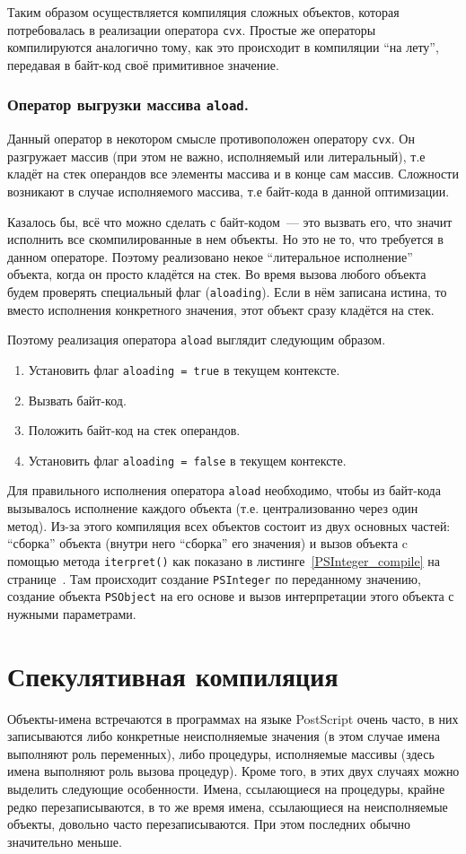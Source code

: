 	Таким образом осуществляется компиляция сложных объектов, которая потребовалась в реализации оператора \texttt{cvx}. Простые же операторы компилируются аналогично тому, как это происходит в компиляции ``на лету'', передавая в байт-код своё примитивное значение.
	\subsubsection*{Оператор выгрузки массива \texttt{aload}.}
	Данный оператор в некотором смысле противоположен оператору \texttt{cvx}. Он разгружает массив (при этом не важно, исполняемый или литеральный), т.е кладёт на стек операндов все элементы массива и в конце сам массив. Сложности возникают в случае исполняемого массива, т.е байт-кода в данной оптимизации.
	
	Казалось бы, всё что можно сделать с байт-кодом~--- это вызвать его, что значит исполнить все скомпилированные в нем объекты. Но это не то, что требуется в данном операторе. Поэтому реализовано некое ``литеральное исполнение'' объекта, когда он просто кладётся на стек. Во время вызова любого объекта будем проверять специальный флаг (\texttt{aloading}). Если  в нём записана истина, то вместо исполнения конкретного значения, этот объект сразу кладётся на стек.
	
	Поэтому реализация оператора \texttt{aload} выглядит следующим образом.
	\begin{enumerate}
		\item Установить флаг \texttt{aloading\,=\,true}  в текущем контексте.
		\item Вызвать байт-код.
		\item Положить байт-код на стек операндов.
		\item Установить флаг \texttt{aloading\,=\,false} в текущем контексте.
	\end{enumerate}
	
	Для правильного исполнения оператора \texttt{aload} необходимо, чтобы из байт-кода вызывалось исполнение каждого объекта (т.е. централизованно через один метод). Из-за этого компиляция всех объектов состоит из двух основных частей: ``сборка'' объекта (внутри него ``сборка'' его значения) и вызов объекта c помощью метода \texttt{iterpret()} как показано в листинге~\ref{PSInteger_compile} на странице~\pageref{PSInteger_compile}. Там происходит  создание \texttt{PSInteger} по переданному значению, создание объекта \texttt{PSObject} на его основе и вызов интерпретации этого объекта с нужными параметрами. 

	\section{Спекулятивная компиляция}
	Объекты-имена встречаются в программах на языке PostScript очень часто, в них записываются либо конкретные неисполняемые значения (в этом случае имена выполняют роль переменных), либо процедуры, исполняемые массивы (здесь имена выполняют роль вызова процедур). Кроме того, в этих двух случаях можно выделить следующие особенности. Имена, ссылающиеся на процедуры, крайне редко перезаписываются, в то же время имена, ссылающиеся на неисполняемые объекты, довольно часто перезаписываются. При этом последних обычно значительно меньше.
	
